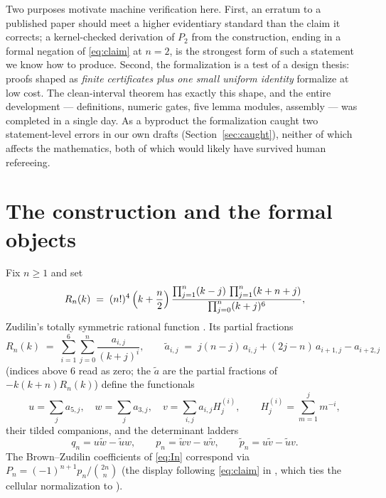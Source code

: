 \documentclass[11pt]{article}
\theoremstyle{definition}
\newcommand{\bin}[2]{\binom{#1}{#2}}
\newcommand{\wtd}{\widetilde}
\begin{document}
Two purposes motivate machine verification here. First, an erratum to a
published paper should meet a higher evidentiary standard than the claim it
corrects; a kernel-checked derivation of $P_2$ from the construction, ending
in a formal negation of \eqref{eq:claim} at $n=2$, is the strongest form of
such a statement we know how to produce. Second, the formalization is a test
of a design thesis: proofs shaped as \emph{finite certificates plus one small
uniform identity} formalize at low cost. The clean-interval theorem has
exactly this shape, and the entire development --- definitions, numeric
gates, five lemma modules, assembly --- was completed in a single day. As a
byproduct the formalization caught two statement-level errors in our own
drafts (Section~\ref{sec:caught}), neither of which affects the mathematics,
both of which would likely have survived human refereeing.

\section{The construction and the formal objects}\label{sec:objects}

Fix $n \ge 1$ and set
\begin{equation}\label{eq:Rn}
R_n(k) \;=\; (n!)^4\,\Bigl(k+\frac n2\Bigr)\,
\frac{\prod_{j=1}^{n}(k-j)\,\prod_{j=1}^{n}(k+n+j)}{\prod_{j=0}^{n}(k+j)^6},
\end{equation}
Zudilin's totally symmetric rational function \cite{Zu02}. Its partial
fractions
\[
R_n(k) \;=\; \sum_{i=1}^{6}\sum_{j=0}^{n} \frac{a_{i,j}}{(k+j)^i},
\qquad
\wtd a_{i,j} \;=\; j(n-j)\,a_{i,j} + (2j-n)\,a_{i+1,j} - a_{i+2,j}
\]
(indices above $6$ read as zero; the $\wtd a$ are the partial fractions of
$-k(k+n)R_n(k)$) define the functionals
\[
u = \sum_j a_{5,j}, \quad
w = \sum_j a_{3,j}, \quad
v = \sum_{i,j} a_{i,j} H_j^{(i)}, \qquad
H_j^{(i)} = \sum_{m=1}^{j} m^{-i},
\]
their tilded companions, and the determinant ladders
\begin{equation}\label{eq:ladders}
q_n = u\wtd w - \wtd u w, \qquad
p_n = \wtd w v - w \wtd v, \qquad
\wtd p_n = u \wtd v - \wtd u v.
\end{equation}
The Brown--Zudilin coefficients of \eqref{eq:In} correspond via
$P_n = (-1)^{n+1} p_n / \bin{2n}{n}$ (the display following
\eqref{eq:claim} in \cite{BZ22}, which ties the cellular normalization to
\cite{Zu02}).
\end{document}
